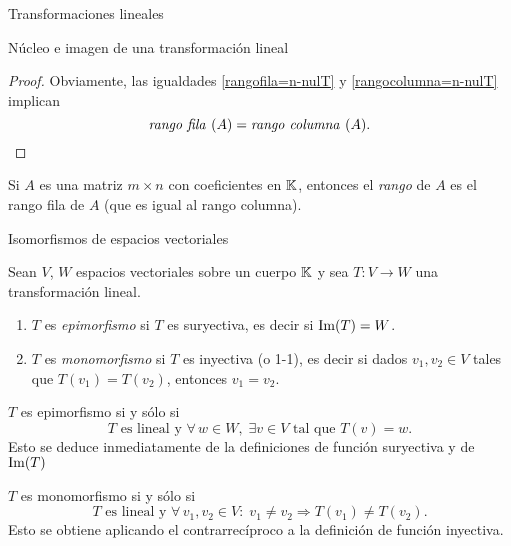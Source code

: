 \begin{chapter}{Transformaciones lineales}
\begin{section}{N\'ucleo e imagen de una transformaci\'on lineal}
\begin{proof}
            Obviamente, las igualdades \eqref{rangofila=n-nulT} y \eqref{rangocolumna=n-nulT} implican 
            $$
        \text{\textit{rango fila }} (A) = \text{\textit{rango  columna }} (A).
        $$
        \end{proof}
    
        \begin{definicion}
                Si $A$ es una matriz $m \times n$ con coeficientes  en $\mathbb K$,  entonces el \textit{rango} de $A$ es el rango fila de $A$ (que es igual al rango columna).
        \end{definicion}
        
        \end{section}
    
        \begin{section}{Isomorfismos de espacios vectoriales}\label{seccion-isomorfismos-de-ev}
        
        \begin{definicion}
            Sean $V$, $W$ espacios vectoriales sobre un cuerpo $\mathbb K$ y sea $T:V \to W$ una transformación lineal.
            \begin{enumerate}
                \item $T$  es \textit{epimorfismo} si $T$ es suryectiva, es decir si $\operatorname{Im}(T) = W$.
                \item $T$ es \textit{monomorfismo} si $T$ es inyectiva (o 1-1),  es decir si dados $v_1,v_2 \in V$ tales que $T(v_1) = T(v_2)$,  entonces $v_1 = v_2$.
            \end{enumerate}  
        \end{definicion}
    
        \begin{obs*}
            $T$  es epimorfismo si y sólo si 
            $$
            \text{$T$ es lineal y }\forall\, w \in W, \; \exists v \in V \text{ tal que }T(v)=w.
            $$
            Esto se deduce inmediatamente de la definiciones de función suryectiva y de $\operatorname{Im}(T)$
            
            $T$ es monomorfismo si y sólo si 
            $$
                \text{$T$ es lineal y }\forall\, v_1,v_2  \in V: \; v_1 \ne v_2 \Rightarrow T(v_1) \not= T(v_2).
            $$ 
            Esto se obtiene aplicando el contrarrecíproco a la definición de función inyectiva.
        \end{obs*}	
        
        
            

\end{section}
\end{chapter}
